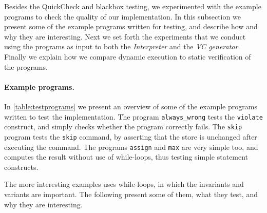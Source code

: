 Besides the QuickCheck and blackbox testing, we experimented with the example programs to check the quality of our implementation.
In this subsection we present some of the example programs written for testing, and describe how and why they are interesting.
Next we set forth the experiments that we conduct using the programs as input to both the \textit{Interpreter} and the \textit{VC generator}.
Finally we explain how we compare dynamic execution to static verification of the programs.

\paragraph{Example programs.}
In \cref{table:testprograms} we present an overview of some of the example programs written to test the implementation.
The program \texttt{always\_wrong} tests the \texttt{violate} construct, and simply checks whether the program correctly fails.
The \texttt{skip} program tests the \texttt{skip} command, by asserting that the store is unchanged after executing the command.
The programs \texttt{assign} and \texttt{max} are very simple too, and computes the result without use of while-loops, thus testing simple statement constructs.

The more interesting examples uses while-loops, in which the invariants and variants are important. The following present some of them, what they test, and why they are interesting.

